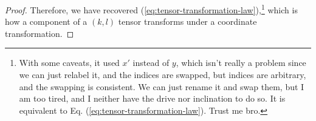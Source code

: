 \begin{solution_pset}
\begin{proof}
		Therefore, we have recovered (\ref{eq:tensor-transformation-law}),\footnote{
			With some caveats, it used $x'$ instead of $y$, which isn't really
			a problem since we can just relabel it, and the indices are 
			swapped, but indices are arbitrary, and the swapping is consistent.
			We can just rename it and swap them, but I am too tired, and I neither
			have the drive nor inclination to do so.
			It is equivalent to Eq. (\ref{eq:tensor-transformation-law}). Trust me bro.
		} which is how a component of a $(k,l)$ tensor transforms under a
		coordinate transformation.
		\end{proof}
		


	\end{solution_pset}
